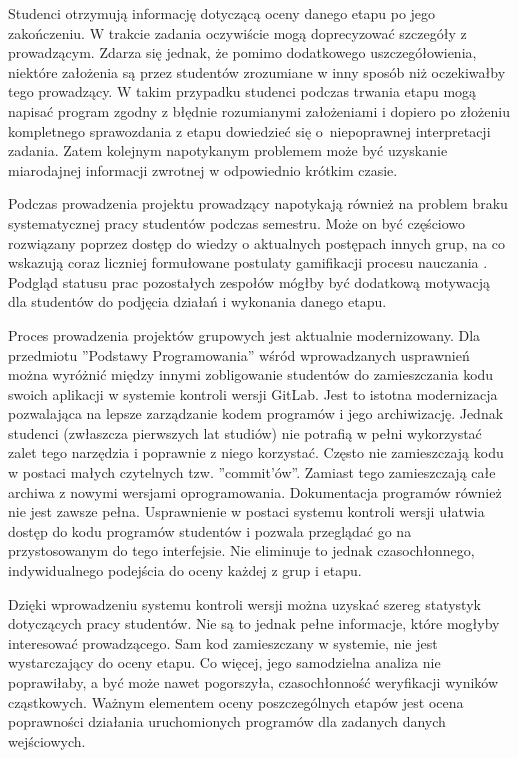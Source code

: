 Studenci otrzymują informację dotyczącą oceny danego etapu po jego zakończeniu.
W trakcie zadania oczywiście mogą doprecyzować szczegóły z prowadzącym.
Zdarza się jednak, że pomimo dodatkowego uszczegółowienia, niektóre założenia są przez studentów zrozumiane w inny sposób niż oczekiwałby tego prowadzący.
W takim przypadku studenci podczas trwania etapu mogą napisać program zgodny z błędnie rozumianymi założeniami i dopiero po złożeniu kompletnego sprawozdania z etapu dowiedzieć się o~niepoprawnej interpretacji zadania.
Zatem kolejnym napotykanym problemem może być uzyskanie miarodajnej informacji zwrotnej w odpowiednio krótkim czasie.

Podczas prowadzenia projektu prowadzący napotykają również na problem braku systematycznej pracy studentów podczas semestru.
Może on być częściowo rozwiązany poprzez dostęp do wiedzy o aktualnych postępach innych grup, na co wskazują coraz liczniej formułowane postulaty gamifikacji procesu nauczania \cite{gamification}.
Podgląd statusu prac pozostałych zespołów mógłby być dodatkową motywacją dla studentów do podjęcia działań i wykonania danego etapu.

Proces prowadzenia projektów grupowych jest aktualnie modernizowany.
Dla przedmiotu ”Podstawy Programowania” wśród wprowadzanych usprawnień można wyróżnić między innymi zobligowanie studentów do zamieszczania kodu swoich aplikacji w systemie kontroli wersji GitLab.
Jest to istotna modernizacja pozwalająca na lepsze zarządzanie kodem programów i jego archiwizację.
Jednak studenci (zwłaszcza pierwszych lat studiów) nie potrafią w pełni wykorzystać zalet tego narzędzia i poprawnie z niego korzystać.
Często nie zamieszczają kodu w postaci małych czytelnych tzw. ”commit'ów”.
Zamiast tego zamieszczają całe archiwa z nowymi wersjami oprogramowania.
Dokumentacja programów również nie jest zawsze pełna.
Usprawnienie w postaci systemu kontroli wersji ułatwia dostęp do kodu programów studentów i pozwala przeglądać go na przystosowanym do tego interfejsie.
Nie eliminuje to jednak czasochłonnego, indywidualnego podejścia do oceny każdej z grup i etapu.

Dzięki wprowadzeniu systemu kontroli wersji można uzyskać szereg statystyk dotyczących pracy studentów.
Nie są to jednak pełne informacje, które mogłyby interesować prowadzącego.
Sam kod zamieszczany w systemie, nie jest wystarczający do oceny etapu.
Co więcej, jego samodzielna analiza nie poprawiłaby, a być może nawet pogorszyła, czasochłonność weryfikacji wyników cząstkowych.
Ważnym elementem oceny poszczególnych etapów jest ocena poprawności działania uruchomionych programów dla zadanych danych wejściowych.

